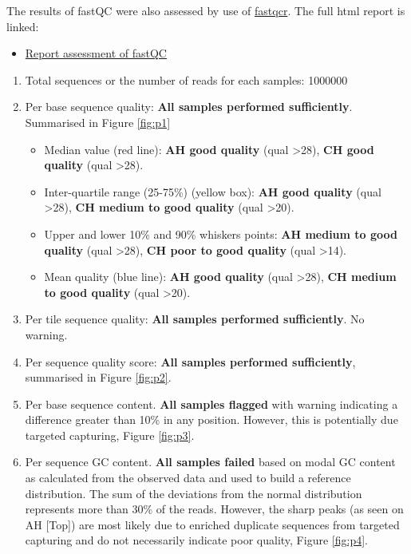 \documentclass{article}
\begin{document}
The results of fastQC were also assessed by use of \href{https://rpkgs.datanovia.com/fastqcr/index.html}{fastqcr}.
The full html report is linked:
\begin{itemize}
	\item \href{https://lawlessgenomics.com/pages/sophia/qc_report.html}{Report assessment of fastQC}
\end{itemize}

\begin{enumerate}
\item Total sequences or the number of reads for each samples: 1000000
\item Per base sequence quality: \textbf{All samples performed sufficiently}. Summarised in Figure \ref{fig:p1}
	\begin{itemize}
	\item Median value (red line):
		 \textbf{AH good quality} (qual >28),
		 \textbf{CH good quality }(qual >28).

	\item Inter-quartile range (25-75\%) (yellow box): 
		 \textbf{AH good quality} (qual >28),
		\textbf{ CH medium to good quality}  (qual >20).

	\item Upper and lower 10\% and 90\% whiskers points:
		 \textbf{AH medium to good quality} (qual >28),
		 \textbf{CH poor to good quality} (qual >14).
	
	\item Mean quality (blue line):
		\textbf{AH good quality} (qual >28),
		\textbf{CH medium to good quality}  (qual >20).
	\end{itemize}

\item Per tile sequence quality: \textbf{All samples performed sufficiently}. No warning.
\item Per sequence quality score: \textbf{All samples performed sufficiently},  summarised in Figure \ref{fig:p2}.
\item Per base sequence content. \textbf{All samples flagged} with warning indicating 
a difference greater than 10\% in any position. However, this is potentially due targeted capturing, Figure \ref{fig:p3}.

\item Per sequence GC content. \textbf{All samples failed} based on modal GC content as calculated from the observed data and used to build a reference distribution. The sum of the deviations from the normal distribution represents more than 30\% of the reads.
However, the sharp peaks (as seen on AH [Top]) are most likely due to enriched duplicate sequences from targeted capturing and do not necessarily indicate poor quality, Figure \ref{fig:p4}.


\end{enumerate}
\end{document}
